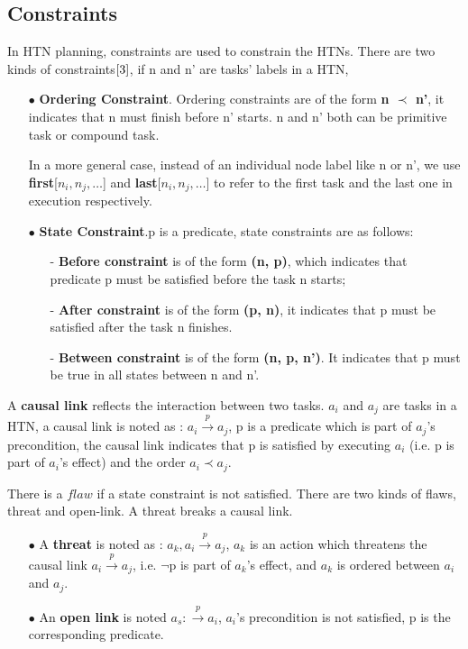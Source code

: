\subsection{Constraints}
\label{sec:constraints}
In HTN planning, constraints are used to constrain the HTNs. There are two kinds of constraints$\cite{3}$, if n and n' are tasks’ labels in a HTN,
\begin{itemize}
\item[$\bullet$] \textbf{Ordering Constraint}. Ordering constraints are of the form \textbf{n $\prec$ n'}, it indicates that n must finish before n' starts. n and n' both can be primitive task or compound task.

In a more general case, instead of an individual node label like n or n', we use \textbf{first}[$n_i, n_j, \ldots$] and \textbf{last}[$n_i, n_j, \ldots$] to refer to the first task and the last one in execution respectively.

\item[$\bullet$] \textbf{State Constraint}.p is a predicate,
state constraints are as follows:
    \begin{itemize}\itemsep0pt \parskip0pt 
    \item[-] \textbf{Before constraint} is of the form \textbf{(n, p)}, which indicates that predicate p must be satisfied before the task n starts;
    \item[-] \textbf{After constraint} is of the form \textbf{(p, n)}, it indicates that p must be satisfied after the task n finishes.
    \item[-] \textbf{Between constraint} is of the form \textbf{(n, p, n')}. It indicates that p must be true in all states between n and n'.
    \end{itemize}
\end{itemize}

A \textbf{causal link} reflects the interaction between two tasks. $a_i$ and  $a_j$ are tasks in a HTN, a causal link is noted as : $a_i \stackrel{p}{\longrightarrow} a_j$, p is a predicate which is part of  $a_j$’s precondition, the causal link indicates that p is satisfied by executing $a_i$ (i.e. p is part of $a_i$’s effect) and the order $a_i \prec a_j$.

There is a $flaw$ if a state constraint is not satisfied. There are two kinds of flaws, threat and open-link. A threat breaks a causal link.
\begin{itemize}\itemsep0pt \parskip0pt 
\item[$\bullet$] A \textbf{threat} is noted as : $a_k, a_i \stackrel{p}{\longrightarrow} a_j$, $a_k$ is an action which threatens the causal link $a_i \stackrel{p}{\longrightarrow} a_j$, i.e. $\neg$p is part of  $a_k$’s effect, and $a_k$ is ordered between $a_i$ and $a_j$.
\item[$\bullet$] An \textbf{open link} is noted $a_s : \stackrel{p}{\longrightarrow} a_i$, $a_i$’s precondition is not satisfied, p is the corresponding predicate.
\end{itemize}

